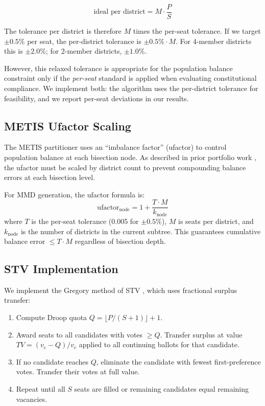 \begin{equation}
  \text{ideal per district} = M \cdot \frac{P}{S}
\end{equation}

The tolerance per district is therefore $M$ times the per-seat tolerance.
If we target $\pm 0.5\%$ per seat, the per-district tolerance is
$\pm 0.5\% \cdot M$.  For 4-member districts this is $\pm 2.0\%$;
for 2-member districts, $\pm 1.0\%$.

However, this relaxed tolerance is appropriate for the population balance
constraint only if the \emph{per-seat} standard is applied when evaluating
constitutional compliance.  We implement both: the algorithm uses the
per-district tolerance for feasibility, and we report per-seat deviations
in our results.

\subsection{METIS Ufactor Scaling}

The METIS partitioner uses an ``imbalance factor'' (ufactor) to control
population balance at each bisection node.  As described in prior portfolio
work \citep{dellib2026edgeweighted}, the ufactor must be scaled by district
count to prevent compounding balance errors at each bisection level.

For MMD generation, the ufactor formula is:
\begin{equation}
  \text{ufactor}_{\text{node}} = 1 + \frac{T \cdot M}{k_{\text{node}}}
\end{equation}
where $T$ is the per-seat tolerance (0.005 for $\pm 0.5\%$), $M$ is seats
per district, and $k_{\text{node}}$ is the number of districts in the current
subtree.  This guarantees cumulative balance error $\leq T \cdot M$ regardless
of bisection depth.

\subsection{STV Implementation}

We implement the Gregory method of STV \citep{gallagher2011ireland}, which
uses fractional surplus transfer:

\begin{enumerate}
  \item Compute Droop quota $Q = \lfloor P / (S+1) \rfloor + 1$.
  \item Award seats to all candidates with votes $\geq Q$.  Transfer surplus
        at value $TV = (v_c - Q) / v_c$ applied to all continuing ballots
        for that candidate.
  \item If no candidate reaches $Q$, eliminate the candidate with fewest
        first-preference votes.  Transfer their votes at full value.
  \item Repeat until all $S$ seats are filled or remaining candidates equal
        remaining vacancies.
\end{enumerate}

